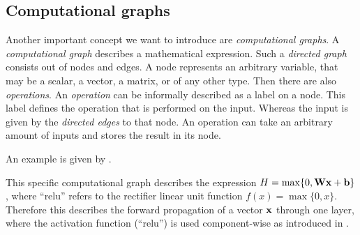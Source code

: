 \subsection{Computational graphs}
\label{sec:computational-graphs}

Another important concept we want to introduce are \emph{computational graphs}.
A \emph{computational graph} describes a mathematical expression.
Such a \emph{directed graph} consists out of nodes and edges.
A node represents an arbitrary variable, that may be a scalar, a vector, a matrix, or of any other type.
Then there are also \emph{operations}.
An \emph{operation} can be informally described as a label on a node.
This label defines the operation that is performed on the input.
Whereas the input is given by the \emph{directed edges} to that node.
An operation can take an arbitrary amount of inputs and stores the result in its node.

An example is given by .


This specific computational graph describes the expression \(H = \max\{0, \mathbf{W}\mathbf{x} + \mathbf{b}\}\), 
where \enquote{relu} refers to the rectifier linear unit function \(f(x) = \max\{0, x\}\).
Therefore this describes the forward propagation of a vector \(\mathbf{x}\) through one layer, where the activation function (\enquote{relu}) is used component-wise as introduced in .